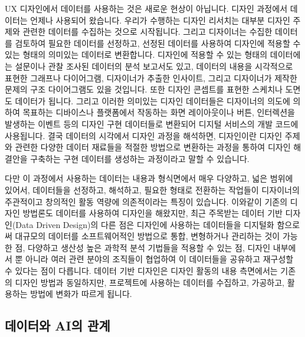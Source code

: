 \documentclass[
  letterpaper,
  DIV=11,
  numbers=noendperiod]{scrreprt}
\begin{document}
UX 디자인에서 데이터를 사용하는 것은 새로운 현상이 아닙니다. 디자인
과정에서 데이터는 언제나 사용되어 왔습니다. 우리가 수행하는 디자인
리서치는 대부분 디자인 주제와 관련한 데이터를 수집하는 것으로
시작됩니다. 그리고 디자이너는 수집한 데이터를 검토하여 필요한 데이터를
선정하고, 선정된 데이터를 사용하여 디자인에 적용할 수 있는 형태의
의미있는 데이터로 변환합니다. 디자인에 적용할 수 있는 형태의 데이터에는
설문이나 관찰 조사된 데이터의 분석 보고서도 있고, 데이터의 내용을
시각적으로 표현한 그래프나 다이어그램, 디자이너가 추출한 인사이트,
그리고 디자이너가 제작한 문제의 구조 다이어그램도 있을 것입니다. 또한
디자인 콘셉트를 표현한 스케치나 도면도 데이터가 됩니다. 그리고 이러한
의미있는 디자인 데이터들은 디자이너의 의도에 의하여 목표하는 디바이스나
플랫폼에서 작동하는 화면 레이아웃이나 버튼, 인터렉션을 발생하는 이벤트
등의 디자인 구현 데이터들로 변환되어 디지털 서비스의 개발 코드에
사용됩니다. 결국 데이터의 시각에서 디자인 과정을 해석하면, 디자인이란
디자인 주제와 관련한 다양한 데이터 재료들을 적절한 방법으로 변환하는
과정을 통하여 디자인 해결안을 구축하는 구현 데이터를 생성하는 과정이라고
말할 수 있습니다.

다만 이 과정에서 사용하는 데이터는 내용과 형식면에서 매우 다양하고, 넓은
범위에 있어서, 데이터들을 선정하고, 해석하고, 필요한 형태로 전환하는
작업들이 디자이너의 주관적이고 창의적인 활동 역량에 의존적이라는 특징이
있습니다. 이와같이 기존의 디자인 방법론도 데이터를 사용하여 디자인을
해왔지만, 최근 주목받는 데이터 기반 디자인(Data Driven Design)의 다른
점은 디자인에 사용하는 데이터들을 디지털화 함으로써 대규모의 데이터를
소프트웨어적인 방법으로 통합, 변형하거나 관리하는 것이 가능한 점,
다양하고 생산성 높은 과학적 분석 기법들을 적용할 수 있는 점, 디자인
내부에서 뿐 아니라 여러 관련 분야의 조직들이 협업하여 이 데이터들을
공유하고 재구성할 수 있다는 점이 다릅니다. 데이터 기반 디자인은 디자인
활동의 내용 측면에서는 기존의 디자인 방법과 동일하지만, 프로젝트에
사용하는 데이터를 수집하고, 가공하고, 활용하는 방법에 변화가 따르게
됩니다.

\subsection{데이터와 AI의
관계}\label{uxb370uxc774uxd130uxc640-aiuxc758-uxad00uxacc4}
\end{document}
